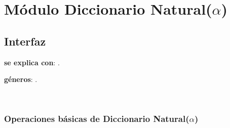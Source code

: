 \section{Módulo Diccionario Natural($\alpha$)}

\subsection{Interfaz}

\textbf{se explica con}: .

\textbf{géneros}: .


~


\subsubsection{Operaciones básicas de Diccionario Natural($\alpha$)}

